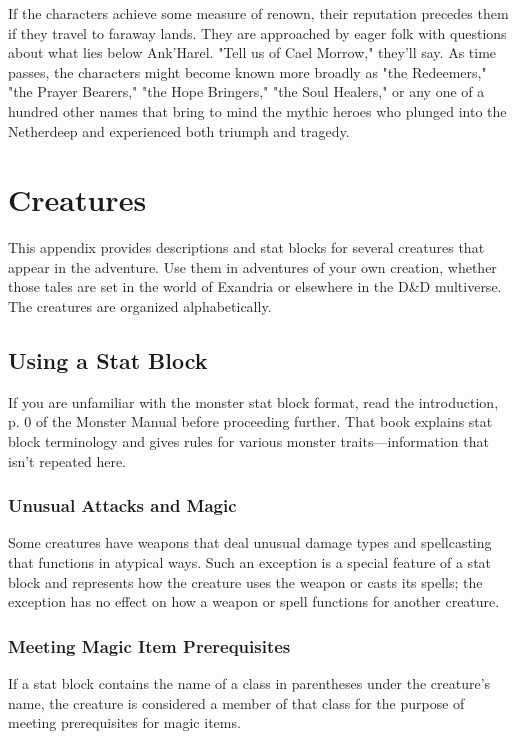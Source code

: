 \documentclass[letterpaper, 11pt, bg=full, twocolumn]{dndbook}
\begin{document}
If the characters achieve some measure of renown, their reputation precedes them if they travel to faraway lands. They are approached by eager folk with questions about what lies below Ank'Harel. "Tell us of Cael Morrow," they'll say. As time passes, the characters might become known more broadly as "the Redeemers," "the Prayer Bearers," "the Hope Bringers," "the Soul Healers," or any one of a hundred other names that bring to mind the mythic heroes who plunged into the Netherdeep and experienced both triumph and tragedy.

\chapter{Creatures}\label{ch:creatures-9-9}

This appendix provides descriptions and stat blocks for several creatures that appear in the adventure. Use them in adventures of your own creation, whether those tales are set in the world of Exandria or elsewhere in the D\&D multiverse.
The creatures are organized alphabetically.
\section{Using a Stat Block}

If you are unfamiliar with the monster stat block format, read the introduction, p. 0 of the Monster Manual before proceeding further. That book explains stat block terminology and gives rules for various monster traits---information that isn't repeated here.

\subsection{Unusual Attacks and Magic}

Some creatures have weapons that deal unusual damage types and spellcasting that functions in atypical ways. Such an exception is a special feature of a stat block and represents how the creature uses the weapon or casts its spells; the exception has no effect on how a weapon or spell functions for another creature.

\subsection{Meeting Magic Item Prerequisites}

If a stat block contains the name of a class in parentheses under the creature's name, the creature is considered a member of that class for the purpose of meeting prerequisites for magic items.
\end{document}
